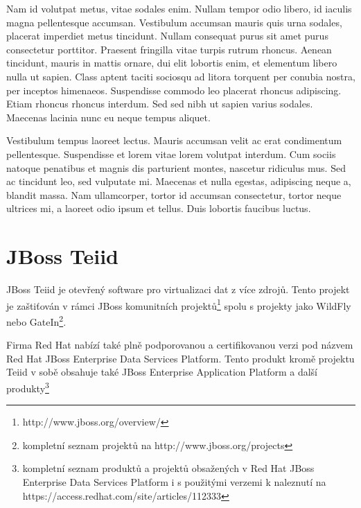 \documentclass[oneside,11pt]{fithesis2}
\begin{document}
Nam id volutpat metus, vitae sodales enim. Nullam tempor odio libero, id iaculis magna pellentesque accumsan. Vestibulum accumsan mauris quis urna sodales, placerat imperdiet metus tincidunt. Nullam consequat purus sit amet purus consectetur porttitor. Praesent fringilla vitae turpis rutrum rhoncus. Aenean tincidunt, mauris in mattis ornare, dui elit lobortis enim, et elementum libero nulla ut sapien. Class aptent taciti sociosqu ad litora torquent per conubia nostra, per inceptos himenaeos. Suspendisse commodo leo placerat rhoncus adipiscing. Etiam rhoncus rhoncus interdum. Sed sed nibh ut sapien varius sodales. Maecenas lacinia nunc eu neque tempus aliquet.

Vestibulum tempus laoreet lectus. Mauris accumsan velit ac erat condimentum pellentesque. Suspendisse et lorem vitae lorem volutpat interdum. Cum sociis natoque penatibus et magnis dis parturient montes, nascetur ridiculus mus. Sed ac tincidunt leo, sed vulputate mi. Maecenas et nulla egestas, adipiscing neque a, blandit massa. Nam ullamcorper, tortor id accumsan consectetur, tortor neque ultrices mi, a laoreet odio ipsum et tellus. Duis lobortis faucibus luctus.



\chapter{JBoss Teiid}
JBoss Teiid je otevřený software pro virtualizaci dat z více zdrojů. Tento projekt je zaštiťován v rámci JBoss komunitních projektů\footnote{http://www.jboss.org/overview/} spolu s projekty jako WildFly nebo GateIn\footnote{kompletní seznam projektů na http://www.jboss.org/projects}.

Firma Red Hat nabízí také plně podporovanou a certifikovanou verzi pod názvem Red Hat JBoss Enterprise Data Services Platform. Tento produkt kromě projektu Teiid v sobě obsahuje také JBoss Enterprise Application Platform a další produkty\footnote{kompletní seznam produktů a projektů obsažených v Red Hat JBoss Enterprise Data Services Platform i s použitými verzemi k naleznutí na https://access.redhat.com/site/articles/112333}
\end{document}
